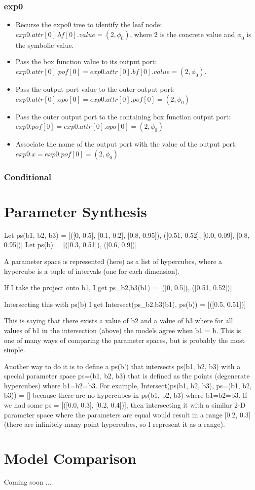 \documentclass{article}
\begin{document}
\subsubsection{exp0}
\begin{itemize}
    \item Recurse the expo0 tree to identify the leaf node: $exp0.attr[0].bf[0].value = (2, \phi_0)$, where $2$ is the concrete value and $\phi_0$ is the symbolic value.
    \item Pass the box function value to its output port: $exp0.attr[0].pof[0] = exp0.attr[0].bf[0].value = (2, \phi_0)$.
    \item Pass the output port value to the outer output port: $exp0.attr[0].opo[0] = exp0.attr[0].pof[0] = (2, \phi_0)$
    \item Pass the outer output port to the containing box function output port: $exp0.pof[0] = exp0.attr[0].opo[0] =  (2, \phi_0)$
    \item Associate the name of the output port with the value of the output port: $exp0.x = exp0.pof[0] =  (2, \phi_0)$
\end{itemize}

\subsubsection{Conditional}


\section{Parameter Synthesis}

Let ps(b1, b2, b3) = [([0, 0.5], [0.1, 0.2], [0.8, 0.95]), ([0.51, 0.52], [0.0, 0.09], [0.8, 0.95])]
Let ps(b) = [([0.3, 0.51]), ([0.6, 0.9])]

A parameter space is represented (here) as a list of hypercubes, where a hypercube is a tuple of intervals (one for each dimension).

If I take the project onto b1, I get ps_b2,b3(b1) = [([0, 0.5]), ([0.51, 0.52])]

Intersecting this with ps(b) I get Intersect(ps_b2,b3(b1), ps(b)) = [([0.5, 0.51])]

This is saying that there exists a value of b2 and a value of b3 where for all values of b1 in the intersection (above) the models agree when b1 = b. This is one of many ways of comparing the parameter spaces, but is probably the most simple.

Another way to do it is to define a ps(b') that intersects ps(b1, b2, b3) with a special parameter space ps=(b1, b2, b3) that is defined as the points (degenerate hypercubes) where b1=b2=b3. For example, Intersect(ps(b1, b2, b3), ps=(b1, b2, b3)) = [] because there are no hypercubes in ps(b1, b2, b3) where b1=b2=b3. If we had some ps = [([0.0, 0.3], [0.2, 0.4])], then intersecting it with a similar 2-D parameter space where the parameters are equal would result in a range [0.2, 0.3] (there are infinitely many point hypercubes, so I represent it as a range).

\section{Model Comparison}

Coming soon ... 
\end{document}

